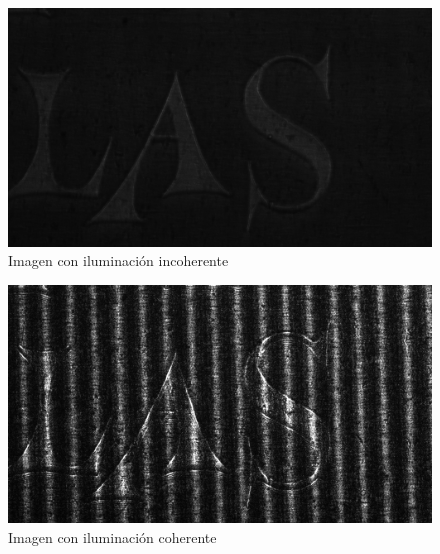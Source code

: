 \documentclass{./packages/optica-article}
\begin{document}
\begin{figure}[h]
    \centering
    \includegraphics[scale=0.18]{parte5-luz-coherente/imagen-letras-con-difusor-y-grating.png}
    \caption{Imagen con iluminación incoherente}
    \label{fig:incoherente}
\end{figure}

\begin{figure}[h]
    \centering
    \includegraphics[scale=0.18]{parte5-luz-coherente/imagen-letras-no-difusor-y-grating.png}
    \caption{Imagen con iluminación coherente}
    \label{fig:coherente}
\end{figure}

%
\end{document}
